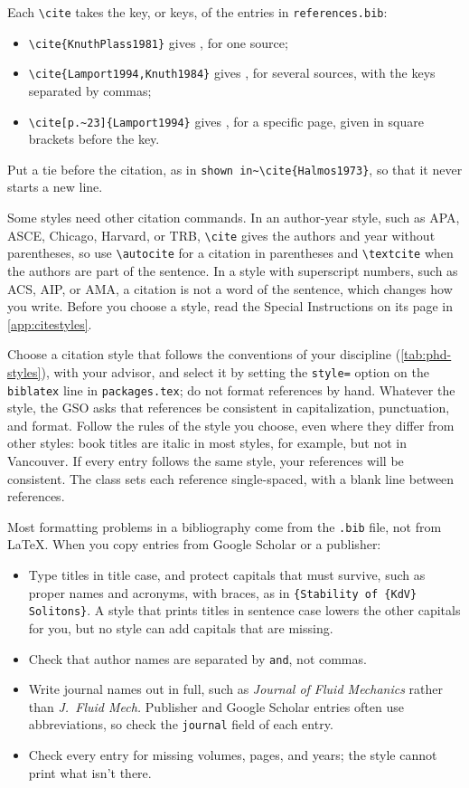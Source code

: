 Each \verb+\cite+ takes the key, or keys, of the entries in \texttt{references.bib}:
\begin{itemize}
\item \verb+\cite{KnuthPlass1981}+ gives \cite{KnuthPlass1981}, for one source;
\item \verb+\cite{Lamport1994,Knuth1984}+ gives \cite{Lamport1994,Knuth1984}, for several sources, with the keys separated by commas;
\item \verb+\cite[p.~23]{Lamport1994}+ gives \cite[p.~23]{Lamport1994}, for a specific page, given in square brackets before the key.
\end{itemize}
Put a tie before the citation, as in \verb+shown in~\cite{Halmos1973}+, so that it never starts a new line.

Some styles need other citation commands. In an author-year style, such as APA, ASCE, Chicago, Harvard, or TRB, \verb+\cite+ gives the authors and year without parentheses, so use \verb+\autocite+ for a citation in parentheses and \verb+\textcite+ when the authors are part of the sentence. In a style with superscript numbers, such as ACS, AIP, or AMA, a citation is not a word of the sentence, which changes how you write. Before you choose a style, read the Special Instructions on its page in \cref{app:citestyles}.

Choose a citation style that follows the conventions of your discipline (\cref{tab:phd-styles}), with your advisor, and select it by setting the \texttt{style=} option on the \texttt{biblatex} line in \texttt{packages.tex}; do not format references by hand. Whatever the style, the GSO asks that references be consistent in capitalization, punctuation, and format. Follow the rules of the style you choose, even where they differ from other styles: book titles are italic in most styles, for example, but not in Vancouver. If every entry follows the same style, your references will be consistent. The class sets each reference single-spaced, with a blank line between references.

Most formatting problems in a bibliography come from the \texttt{.bib} file, not from \LaTeX. When you copy entries from Google Scholar or a publisher:
\begin{itemize}
\item Type titles in title case, and protect capitals that must survive, such as proper names and acronyms, with braces, as in \verb+{Stability of {KdV} Solitons}+. A style that prints titles in sentence case lowers the other capitals for you, but no style can add capitals that are missing.
\item Check that author names are separated by \verb+and+, not commas.
\item Write journal names out in full, such as \emph{Journal of Fluid Mechanics} rather than \emph{J.\ Fluid Mech.} Publisher and Google Scholar entries often use abbreviations, so check the \verb+journal+ field of each entry.
\item Check every entry for missing volumes, pages, and years; the style cannot print what isn't there.
\end{itemize}


